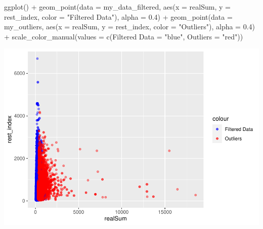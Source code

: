 \documentclass[
]{article}
\newenvironment{Shaded}{\begin{snugshade}}{\end{snugshade}}
\newcommand{\AttributeTok}[1]{\textcolor[rgb]{0.77,0.63,0.00}{#1}}
\newcommand{\FloatTok}[1]{\textcolor[rgb]{0.00,0.00,0.81}{#1}}
\newcommand{\FunctionTok}[1]{\textcolor[rgb]{0.00,0.00,0.00}{#1}}
\newcommand{\NormalTok}[1]{#1}
\newcommand{\OtherTok}[1]{\textcolor[rgb]{0.56,0.35,0.01}{#1}}
\newcommand{\SpecialCharTok}[1]{\textcolor[rgb]{0.00,0.00,0.00}{#1}}
\newcommand{\StringTok}[1]{\textcolor[rgb]{0.31,0.60,0.02}{#1}}
\begin{document}
\begin{Shaded}
\begin{Highlighting}[]
\FunctionTok{ggplot}\NormalTok{() }\SpecialCharTok{+} \FunctionTok{geom\_point}\NormalTok{(}\AttributeTok{data =}\NormalTok{ my\_data\_filtered, }\FunctionTok{aes}\NormalTok{(}\AttributeTok{x =}\NormalTok{ realSum,}
    \AttributeTok{y =}\NormalTok{ rest\_index, }\AttributeTok{color =} \StringTok{"Filtered Data"}\NormalTok{), }\AttributeTok{alpha =} \FloatTok{0.4}\NormalTok{) }\SpecialCharTok{+}
    \FunctionTok{geom\_point}\NormalTok{(}\AttributeTok{data =}\NormalTok{ my\_outliers, }\FunctionTok{aes}\NormalTok{(}\AttributeTok{x =}\NormalTok{ realSum, }\AttributeTok{y =}\NormalTok{ rest\_index,}
        \AttributeTok{color =} \StringTok{"Outliers"}\NormalTok{), }\AttributeTok{alpha =} \FloatTok{0.4}\NormalTok{) }\SpecialCharTok{+} \FunctionTok{scale\_color\_manual}\NormalTok{(}\AttributeTok{values =} \FunctionTok{c}\NormalTok{(}\StringTok{\textasciigrave{}}\AttributeTok{Filtered Data}\StringTok{\textasciigrave{}} \OtherTok{=} \StringTok{"blue"}\NormalTok{,}
    \AttributeTok{Outliers =} \StringTok{"red"}\NormalTok{))}
\end{Highlighting}
\end{Shaded}

\includegraphics{Project_files/figure-latex/unnamed-chunk-20-1.pdf}
\end{document}
